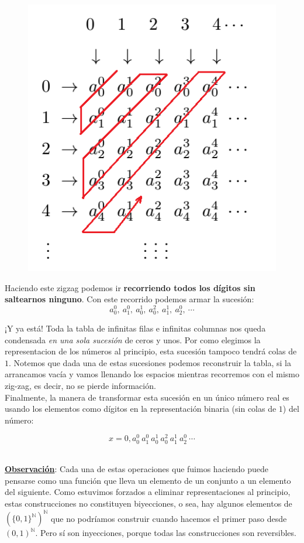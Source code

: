 \documentclass[10pt,a4paper]{article}
\newcommand{\N}{\mathbb{N}}
\begin{document}
\begin{figure}[h!]
\centering
\includegraphics[scale=0.9]{diagonales.png}
\end{figure}

Haciendo este zigzag podemos ir \textbf{recorriendo todos los dígitos sin saltearnos ninguno}. Con este recorrido podemos armar la sucesión: 
\[ a_0^0,\ a_1^0,\ a_0^1, \ a_0^2,\ a_1^1,\ a_2^0, \ \cdots \]

¡Y ya está! Toda la tabla de infinitas filas e infinitas columnas nos queda condensada \textit{en una sola sucesión} de ceros y unos. Por como elegimos la representacion de los números al principio, esta sucesión tampoco tendrá colas de $1$. Notemos que dada una de estas sucesiones podemos reconstruir la tabla, si la arrancamos vacía y vamos llenando los espacios mientras recorremos con el mismo zig-zag, es decir, no se pierde información. \\


Finalmente, la manera de transformar esta sucesión en un único número real es usando los elementos como dígitos en la representación binaria (sin colas de $1$) del número:

\[ x = 0,a_0^0\ a_1^0\ a_0^1 \ a_0^2\ a_1^1\ a_2^0 \ \cdots \]



\ \\
\textbf{\underline{Observación}}: Cada una de estas operaciones que fuimos haciendo puede pensarse como una función que lleva un elemento de un conjunto a un elemento del siguiente. Como estuvimos forzados a eliminar representaciones al principio, estas construcciones no constituyen biyecciones, o sea, hay algunos elementos de $(\{0,1 \}^\N)^\N$ que no podríamos construir cuando hacemos el primer paso desde $(0,1)^\N$. Pero sí son inyecciones, porque todas las construcciones son reversibles. 
\end{document}
